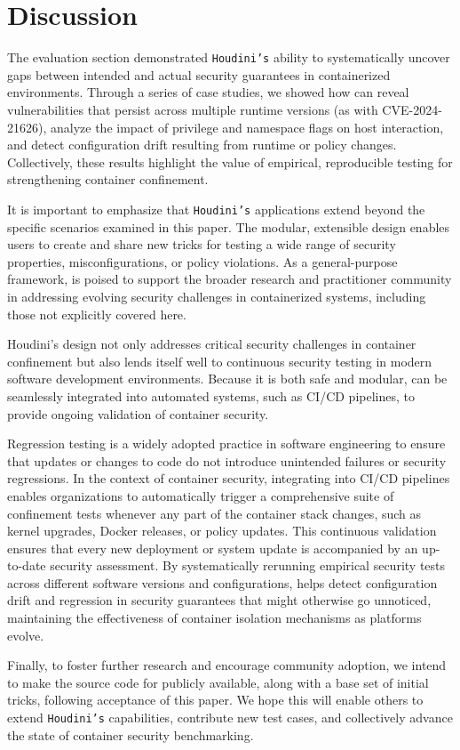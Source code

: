 \section{Discussion}
\label{sec:discussion}
The evaluation section demonstrated \texttt{Houdini's}\xspace ability to systematically uncover gaps between intended and actual security guarantees in containerized environments. Through a series of case studies, we showed how \houdini can reveal vulnerabilities that persist across multiple runtime versions (as with CVE-2024-21626), analyze the impact of privilege and namespace flags on host interaction, and detect configuration drift resulting from runtime or policy changes. Collectively, these results highlight the value of empirical, reproducible testing for strengthening container confinement.

It is important to emphasize that \texttt{Houdini's}\xspace applications extend beyond the specific scenarios examined in this paper. The modular, extensible design enables users to create and share new tricks for testing a wide range of security properties, misconfigurations, or policy violations. As a general-purpose framework, \houdini is poised to support the broader research and practitioner community in addressing evolving security challenges in containerized systems, including those not explicitly covered here.

Houdini’s design not only addresses critical security challenges in container confinement but also lends itself well to continuous security testing in modern software development environments. Because it is both safe and modular, \houdini can be seamlessly integrated into automated systems, such as CI/CD pipelines, to provide ongoing validation of container security.

Regression testing is a widely adopted practice in software engineering to ensure that updates or changes to code do not introduce unintended failures or security regressions. In the context of container security, integrating \houdini into CI/CD pipelines enables organizations to automatically trigger a comprehensive suite of confinement tests whenever any part of the container stack changes, such as kernel upgrades, Docker releases, or policy updates. This continuous validation ensures that every new deployment or system update is accompanied by an up-to-date security assessment. By systematically rerunning empirical security tests across different software versions and configurations, \houdini helps detect configuration drift and regression in security guarantees that might otherwise go unnoticed, maintaining the effectiveness of container isolation mechanisms as platforms evolve.

Finally, to foster further research and encourage community adoption, we intend to make the source code for \houdini publicly available, along with a base set of initial tricks, following acceptance of this paper. We hope this will enable others to extend \texttt{Houdini's}\xspace capabilities, contribute new test cases, and collectively advance the state of container security benchmarking.
